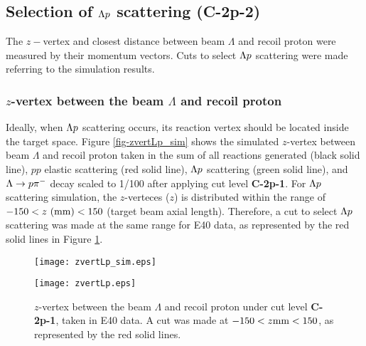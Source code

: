 \clearpage
\subsection{Selection of $\Lp$ scattering ({\bf C-2p-2})}
The $z-$vertex and closest distance between beam $\Lambda$ and recoil proton were measured by their momentum vectors. Cuts to select $\Lp$ scattering were made referring to the simulation results. 

\subsubsection{$z$-vertex between the beam $\Lambda$ and recoil proton}

Ideally, when $\Lp$ scattering occurs, its reaction vertex should be located inside the target space. Figure \ref{fig-zvertLp_sim} shows the simulated $z$-vertex between beam $\Lambda$ and recoil proton taken in the sum of all reactions generated (black solid line), $pp$ elastic scattering (red solid line), $\Lp$ scattering (green solid line), and $\Ldecay$ decay scaled to 1/100 after applying cut level {\bf C-2p-1}. For $\Lp$ scattering simulation, the $z$-verteces ($z$) is distributed within the range of $-150< z\ {\rm (mm)} <150$ (target beam axial length). Therefore, a cut to select $\Lp$ scattering was made at the same range for E40 data, as represented by the red solid lines in Figure \ref{fig-zvertLp}.

\begin{figure}[!h]
  \begin{minipage}[t]{0.48\columnwidth}
    \centering
    \texttt{[image: zvertLp\_sim.eps]}
    \caption{Simulation of the $z$-vertex between the beam $\Lambda$ and recoil proton under cut level {\bf C-2p-1}, taken in simulation data. The black solid line represents the results of the sum of all reactions generated, the red one represents the results of the $pp$ elastic scattering, the green one represents the results of the $\Lp$ scattering, and the blue one represents the results of $\Ldecay$ decay scaled to 1/100. Almost all $\Lp$ scattering events would distribute within the target space ($\pm150$ mm).}
    \label{fig-zvertLp_sim}
  \end{minipage}
  \hspace{0.04\columnwidth} %
  \begin{minipage}[t]{0.48\columnwidth}
    \centering
    \texttt{[image: zvertLp.eps]}
    \caption{$z$-vertex between the beam $\Lambda$ and recoil proton under cut level {\bf C-2p-1}, taken in E40 data. A cut was made at $-150 < z {\rm mm} < 150$, as represented by the red solid lines.}
    \label{fig-zvertLp}
  \end{minipage}
\end{figure}



